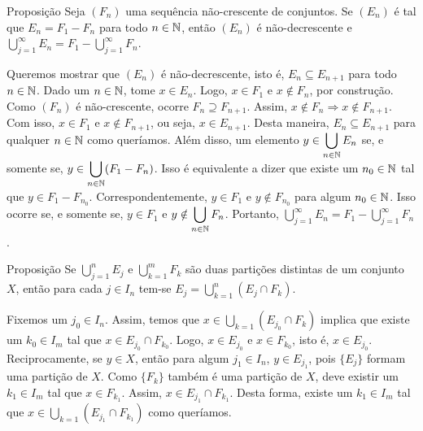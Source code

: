 \begin{env}{Proposição}
\label{prop:sequencia-decrescente-conjuntos-resultado-A_n}
Seja $(F_n)$ uma sequência não-crescente de conjuntos. 
Se $(E_n)$ é tal que $E_n = F_1 - F_n$ para todo $n \in \operatorname{\mathbb{N}}$, então $(E_n)$ é não-decrescente e 
$\displaystyle \bigcup_{j = 1}^\infty E_n = \displaystyle F_1 - \bigcup_{j = 1}^\infty F_n$.
\end{env}

\begin{prova}
    Queremos mostrar que $(E_n)$ é não-decrescente, isto é, $E_n \subseteq E_{n+1}$ para todo $n \in \operatorname{\mathbb{N}}$.
    Dado um $n \in \operatorname{\mathbb{N}}$, tome $x \in E_n$. 
    Logo, $x \in F_1$ e $x \notin F_n$, por construção.
    Como $(F_n)$ é não-crescente, ocorre $F_{n} \supseteq F_{n+1}$. 
    Assim, $x \notin F_n \Rightarrow x \notin F_{n+1}$.
    Com isso, $x \in F_1$ e $x \notin F_{n+1}$, ou seja,
    $x \in E_{n+1}$.
    Desta maneira, $E_n \subseteq E_{n+1}$ para qualquer $n \in \operatorname{\mathbb{N}}$ como queríamos.
    Além disso, um elemento $y \in \displaystyle \bigcup_{n \in \operatorname{\mathbb{N}}} E_n$ se, e somente se,
    $y \in \displaystyle \bigcup_{n \in \operatorname{\mathbb{N}}} (F_1 - F_n)$.
    Isso é equivalente a dizer que existe um $n_0 \in \operatorname{\mathbb{N}}$ tal que $y \in F_1 - F_{n_0}$.
    Correspondentemente, $ y \in F_1$ e $y \notin F_{n_0}$ para algum $n_0 \in \operatorname{\mathbb{N}}$.
    Isso ocorre se, e somente se, $y \in F_1$ e $y \notin \displaystyle \bigcup_{n \in \operatorname{\mathbb{N}}} F_n$.
    Portanto, $\displaystyle \bigcup_{j = 1}^\infty E_n = \displaystyle F_1 - \bigcup_{j = 1}^\infty F_n$.
\end{prova}

\begin{env}{Proposição}
	\label{prop: duas partições}
	Se $\displaystyle \bigcup_{j = 1}^n E_j$ e $\displaystyle \bigcup_{k = 1}^m F_k$ são duas partições distintas de um conjunto $X$, então
	para cada $j \in I_n$ tem-se $E_j = \displaystyle \bigcup_{k = 1}^n (E_j \cap F_k)$.
\end{env}
\begin{prova}
	Fixemos um $j_0 \in I_n$.
	Assim, temos que $x \in \bigcup_{k = 1} (E_{j_0} \cap F_k)$ implica que existe um $k_0 \in I_m$ tal que  $x \in E_{j_0}\cap F_{k_0}$.
	Logo, $x \in E_{j_0}$ e $x \in F_{k_0}$, isto é, $x \in E_{j_0}$.
	Reciprocamente, se $y \in X$, então para algum $j_1 \in I_n$, $y \in E_{j_1}$, pois $\{E_j\}$ formam uma partição de $X$.
	Como $\{F_k\}$ também é uma partição de $X$, deve existir um $k_1 \in I_m$ tal que $x \in F_{k_1}$.
	Assim, $x \in E_{j_1} \cap F_{k_1}$. 
	Desta forma, existe um $k_1 \in I_m$ tal que $x \in \displaystyle \bigcup_{k = 1} (E_{j_1} \cap F_{k_1})$ como queríamos.	 
\end{prova}

